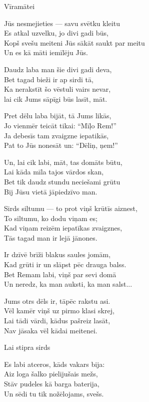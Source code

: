 \documentclass[14pt]{extarticle}
\begin{document}
{{\newpage

{\large \sc Vīramātei}

Jūs nesmejieties --- savu svētku kleitu\\
Es atkal uzvelku, jo divi gadi būs,\\
Kopš svešu meiteni Jūs sākāt saukt par meitu\\
Un es kā māti iemīlēju Jūs.

Daudz laba man šie divi gadi deva,\\
Bet tagad bieži ir ap sirdi tā,\\
Ka nerakstīt šo vēstuli vairs nevar,\\
lai cik Jums sāpīgi būs lasīt, māt.

Pret dēlu laba bijāt, tā Jums likās,\\
Jo vienmēr teicāt tikai: ``Mīļo Rem!''\\
Ja debesīs tam zvaigzne iepatikās,\\
Pat to Jūs nonesāt un: ``Dēliņ, ņem!''

Un, lai cik labi, māt, tas domāts būtu,\\
Lai kāda mīla tajos vārdos skan,\\
Bet tik daudz stundu neciešami grūtu\\
Bij Jūsu vietā jāpiedzīvo man. 

Sirds siltumu --- to prot viņš krūtīs aiznest,\\
To siltumu, ko dodu viņam es;\\
Kad viņam reizēm iepatīkas zvaigznes,\\
Tās tagad man ir lejā jānones.

Ir dzīvē brīži blakus saules jomām,\\
Kad grūti ir un slāpst pēc drauga balss.\\
Bet Remam labi, viņš par sevi domā\\
Un neredz, ka man auksti, ka man salst...

Jums otrs dēls ir, tāpēc rakstu asi.\\
Vēl kamēr viņš uz pirmo klasi skrej,\\
Lai tādi vārdi, kādus pašreiz lasāt,\\
Nav jāsaka vēl kādai meitenei. 


\newpage 

{\large \sc Lai stipra sirds}

Es labi atceros, kāds vakars bija:\\
Aiz loga šalko pielijušais mežs,\\
Stāv pudeles kā barga baterija,\\
Un sēdi tu tik nožēlojams, svešs. 

}}
\end{document}
